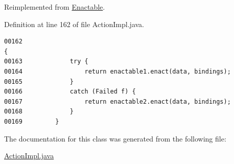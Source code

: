 Reimplemented from \hyperlink{interfaceEnactable_a0}{Enactable}.

Definition at line 162 of file Action\-Impl.java.\footnotesize\begin{verbatim}00162                                                                                    {
00163             try {
00164                 return enactable1.enact(data, bindings);
00165             }
00166             catch (Failed f) {
00167                 return enactable2.enact(data, bindings);
00168             }
00169         }
\end{verbatim}\normalsize 


The documentation for this class was generated from the following file:\begin{CompactItemize}
\item 
\hyperlink{ActionImpl_8java-source}{Action\-Impl.java}\end{CompactItemize}
